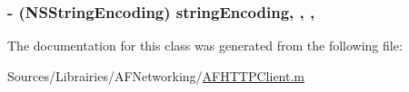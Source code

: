 \hypertarget{interface_a_f_h_t_t_p_body_part_a842a1899ac06a5ca474a00d1c7a7d7fd}{
\subsubsection[{string\-Encoding}]{\setlength{\rightskip}{0pt plus 5cm}-\/ (N\-S\-String\-Encoding) string\-Encoding\hspace{0.3cm}{\ttfamily [read]}, {\ttfamily [write]}, {\ttfamily [nonatomic]}, {\ttfamily [assign]}}}\label{interface_a_f_h_t_t_p_body_part_a842a1899ac06a5ca474a00d1c7a7d7fd}


The documentation for this class was generated from the following file\-:\begin{DoxyCompactItemize}
\item 
Sources/\-Librairies/\-A\-F\-Networking/\hyperlink{_a_f_h_t_t_p_client_8m}{A\-F\-H\-T\-T\-P\-Client.\-m}\end{DoxyCompactItemize}
